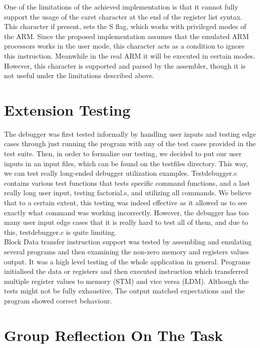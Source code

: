 \documentclass[11pt]{article}
\begin{document}
One of the limitations of the achieved implementation is that it cannot fully support the usage of the caret character at the end of the register list syntax. This character if present, sets the S flag, which works with privileged modes of the ARM. Since the proposed implementation assumes that the emulated ARM processors works in the user mode, this character acts as a condition to ignore this instruction. Meanwhile in the real ARM it will be executed in certain modes. However, this character is supported and parsed by the assembler, though it is not useful under the limitations described above. \\

\section{Extension Testing}

The debugger was first tested informally by handling user inputs and testing edge cases through just running the program with any of the test cases provided in the test suite. Then, in order to formalize our testing, we decided to put our user inputs in an input files, which can be found on the testfiles directory. This way, we can test really long-ended debugger utilization examples. Testdebugger.c contains various test functions that tests specific command functions, and a last really long user input, testing factorial.s, and utilizing all commands. We believe that to a certain extent, this testing was indeed effective as it allowed us to see exactly what command was working incorrectly. However, the debugger  has too many user input edge cases that it is really hard to test all of them, and due to this, testdebugger.c is quite limiting.\\

Block Data transfer instruction support was tested by assembling and emulating several programs and then examining the non-zero memory and registers values output. It was a high level testing of the whole application in general. Programs initialised the data or registers and then executed instruction which transferred multiple register values to memory (STM) and vice versa (LDM). Although the tests might not be fully exhaustive, The output matched expectations and the program showed correct behaviour. \\

\section{Group Reflection On The Task}
\end{document}
